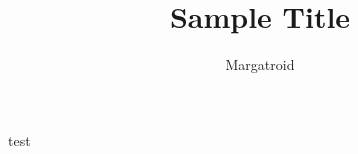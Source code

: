 \documentclass[UTF8,a4paper]{article}
\title{Sample Title}
\author{Margatroid}
\begin{document}
\maketitle

test
\end{document}
